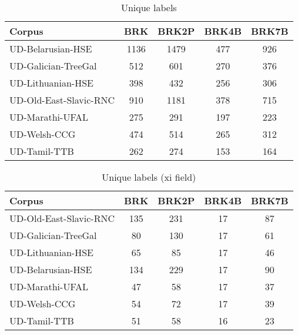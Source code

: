 
        \begin{table}[h]
            \centering
            \caption{Unique labels}
            \label{tab:unique}
            \begin{tabular}{lcccc}
                \hline
                Corpus                          &  BRK & BRK2P & BRK4B & BRK7B \\
                \hline
                UD-Belarusian-HSE & 1136 & 1479 & 477 & 926 \\
                UD-Galician-TreeGal & 512 & 601 & 270 & 376 \\
                UD-Lithuanian-HSE & 398 & 432 & 256 & 306 \\
                UD-Old-East-Slavic-RNC & 910 & 1181 & 378 & 715 \\
                UD-Marathi-UFAL & 275 & 291 & 197 & 223 \\
                UD-Welsh-CCG & 474 & 514 & 265 & 312 \\
                UD-Tamil-TTB                    &  262 &   274 &   153 &   164 \\
                \hline
            \end{tabular}
        \end{table}


        \begin{table}[h]
            \centering
            \caption{Unique labels (xi field)}
            \label{tab:unique}
            \begin{tabular}{lcccc}
                \hline
                Corpus                      & BRK & BRK2P & BRK4B & BRK7B \\
                \hline
                UD-Old-East-Slavic-RNC & 135 & 231 & 17 & 87 \\
                UD-Galician-TreeGal & 80 & 130 & 17 & 61 \\
                UD-Lithuanian-HSE & 65 & 85 & 17 & 46 \\
                UD-Belarusian-HSE & 134 & 229 & 17 & 90 \\
                UD-Marathi-UFAL & 47 & 58 & 17 & 37 \\
                UD-Welsh-CCG & 54 & 72 & 17 & 39 \\
                UD-Tamil-TTB                &  51 &    58 &    16 &    23 \\
                \hline
            \end{tabular}
        \end{table}